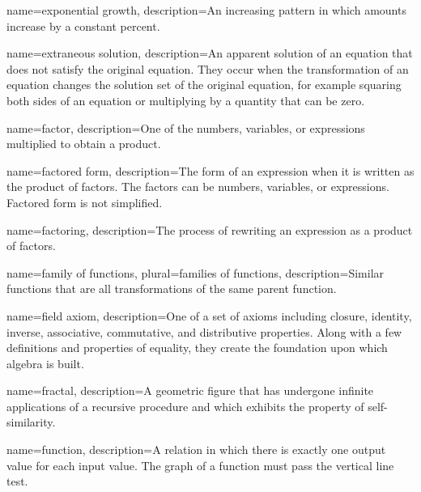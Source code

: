 {
	name=exponential growth,
	description={An increasing pattern in which amounts increase by a constant percent.}
}

 {
	name=extraneous solution,
	description={An apparent solution of an equation that does not satisfy the original equation. They occur when the transformation of an equation changes the solution set of the original equation, for example squaring both sides of an equation or multiplying by a quantity that can be zero.}
}

 {
	name=factor,
	description={One of the numbers, variables, or expressions multiplied to obtain a product.}
}

 {
	name=factored form,
	description={The form of an expression when it is written as the product of factors. The factors can be numbers, variables, or expressions. Factored form is not simplified.}
}

 {
	name=factoring,
	description={The process of rewriting an expression as a product of factors.}
}

 {
	name=family of functions,
	plural=families of functions,
	description={Similar functions that are all transformations of the same parent function.}
}

 {
	name=field axiom,
	description={One of a set of axioms including closure, identity, inverse, associative, commutative, and distributive properties. Along with a few definitions and properties of equality, they create the foundation upon which algebra is built.}
}


 {
	name=fractal,
	description={A geometric figure that has undergone infinite applications of a recursive procedure and which exhibits the property of self-similarity. }
}

 {
	name=function,
	description={A relation in which there is exactly one output value for each input value. The graph of a function must pass the vertical line test.}
}

